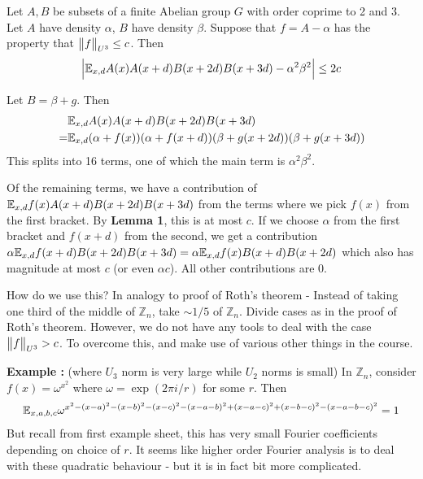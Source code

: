 \documentclass[12pt,a4paper]{report}
\newenvironment{proof}
{\begin{changemargin}{1cm}{0.5cm}
	}%
	{\end{changemargin}
}
\begin{document}
 Let $A,B$ be subsets of a finite Abelian group $G$ with order coprime to 2 and 3. Let $A$ have density $\alpha$, $B$ have density $\beta$. Suppose that $f=A-\alpha$ has the property that $\bigl\lVert f\bigr\rVert_{U^3} \leq c$. Then
\begin{align*}
\Big| \mathbb{E}_{x,d} A(x) A(x+d) B(x+2d) B(x+3d) - \alpha^2 \beta^2 \Big| \leq 2c
\end{align*}
\begin{proof}
\pf Let $B = \beta + g$. Then
\begin{align*}
&\mathbb{E}_{x,d} A(x) A(x+d) B(x+2d) B(x+3d) \\
=& \mathbb{E}_{x,d} (\alpha + f(x)) (\alpha + f(x+d)) (\beta + g(x+2d))(\beta + g(x+3d)) 
\end{align*}
This splits into 16 terms, one of which the main term is $\alpha^2 \beta^2$.

\quad Of the remaining terms, we have a contribution of $\mathbb{E}_{x,d} f(x)A(x+d) B(x+2d) B(x+3d)$ from the terms where we pick $f(x)$ from the first bracket. By \textbf{Lemma 1}, this is at most $c$. If we choose $\alpha$ from the first bracket and $f(x+d)$ from the second, we get a contribution $\alpha \mathbb{E}_{x,d} f(x+d) B(x+2d) B(x+3d) = \alpha \mathbb{E}_{x,d} f(x) B(x+d) B(x+2d)$ which also has magnitude at most $c$ (or even $\alpha c$). All other contributions are 0. 

\eop
\end{proof}
\s

How do we use this? In analogy to proof of Roth's theorem - Instead of taking one third of the middle of $\mathbb{Z}_n$, take $\sim 1/5$ of $\mathbb{Z}_n$. Divide cases as in the proof of Roth's theorem. However, we do not have any tools to deal with the case $\bigl\lVert f\bigr\rVert_{U^3} > c$. To overcome this, and make use of various other things in the course.
\s

\textbf{Example :} (where $U_3$ norm is very large while $U_2$ norms is small) In $\mathbb{Z}_n$, consider $f(x) = \omega^{x^2}$ where $\omega = \exp(2\pi i /r)$ for some $r$. Then
\begin{align*}
\mathbb{E}_{x,a,b,c} \omega^{x^2 - (x-a)^2 - (x-b)^2 - (x-c)^2 - (x-a-b)^2  + (x-a-c)^2 + (x-b-c)^2 - (x-a-b-c)^2} = 1 
\end{align*}
But recall from first example sheet, this has very small Fourier coefficients depending on choice of $r$. It seems like higher order Fourier analysis is to deal with these quadratic behaviour - but it is in fact bit more complicated.
\end{document}
